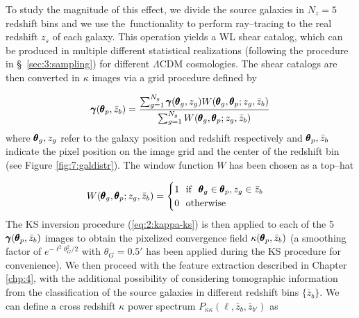 %
To study the magnitude of this effect, we divide the source galaxies in $N_z=5$ redshift bins and we use the \LT\,functionality to perform ray--tracing to the real redshift $z_s$ of each galaxy. This operation yields a WL shear catalog, which can be produced in multiple different statistical realizations (following the procedure in \S~\ref{sec:3:sampling}) for different $\Lambda$CDM cosmologies. The shear catalogs are then converted in $\kappa$ images via a grid procedure defined by

\begin{equation}
\label{eq:7:gridding}
\pmb{\gamma}(\pmb{\theta}_p,\bar{z}_b) = \frac{\sum_{g=1}^{N_g}\pmb{\gamma}(\pmb{\theta}_g,z_g)W(\pmb{\theta}_g,\pmb{\theta}_p;z_g,\bar{z}_b)}{\sum_{g=1}^{N_g}W(\pmb{\theta}_g,\pmb{\theta}_p;z_g,\bar{z}_b)}
\end{equation}  
%
where $\pmb{\theta}_g,z_g$ refer to the galaxy position and redshift respectively and $\pmb{\theta}_p,\bar{z}_b$ indicate the pixel position on the image grid and the center of the redshift bin (see Figure \ref{fig:7:galdistr}). The window function $W$ has been chosen as a top--hat 

\begin{equation}
\label{eq:7:that}
W(\pmb{\theta}_g,\pmb{\theta}_p;z_g,\bar{z}_b) = 
\begin{cases}
1 \,\,\,\, {\rm if} \,\,\,\, \pmb{\theta}_g\in\pmb{\theta}_p,z_g\in\bar{z}_b \\
0 \,\,\,\, {\rm otherwise}
\end{cases}
\end{equation}
%
The KS inversion procedure (\ref{eq:2:kappa-ks}) is then applied to each of the 5 $\pmb{\gamma}(\pmb{\theta}_p,\bar{z}_b)$ images to obtain the pixelized convergence field  $\kappa(\pmb{\theta}_p,\bar{z}_b)$ (a smoothing factor of $e^{-\ell^2\theta_G^2/2}$ with $\theta_G=0.5'$ has been applied during the KS procedure for convenience). We then proceed with the feature extraction described in Chapter \ref{chp:4}, with the additional possibility of considering tomographic information from the classification of the source galaxies in different redshift bins $\{\bar{z}_b\}$. We can define a cross redshift $\kappa$ power spectrum $P_{\kappa\kappa}(\ell,\bar{z}_b,\bar{z}_{b'})$ as 

